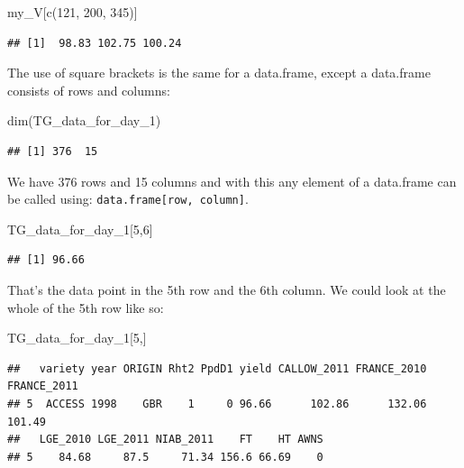 \documentclass[
]{book}
\newenvironment{Shaded}{\begin{snugshade}}{\end{snugshade}}
\newcommand{\DecValTok}[1]{\textcolor[rgb]{0.00,0.00,0.81}{#1}}
\newcommand{\FunctionTok}[1]{\textcolor[rgb]{0.00,0.00,0.00}{#1}}
\newcommand{\NormalTok}[1]{#1}
\begin{document}
\begin{Shaded}
\begin{Highlighting}[]
\NormalTok{my\_V[}\FunctionTok{c}\NormalTok{(}\DecValTok{121}\NormalTok{, }\DecValTok{200}\NormalTok{, }\DecValTok{345}\NormalTok{)]}
\end{Highlighting}
\end{Shaded}

\begin{verbatim}
## [1]  98.83 102.75 100.24
\end{verbatim}

The use of square brackets is the same for a data.frame, except a data.frame consists of rows and columns:

\begin{Shaded}
\begin{Highlighting}[]
\FunctionTok{dim}\NormalTok{(TG\_data\_for\_day\_1)}
\end{Highlighting}
\end{Shaded}

\begin{verbatim}
## [1] 376  15
\end{verbatim}

We have 376 rows and 15 columns and with this any element of a data.frame can be called using: \texttt{data.frame{[}row,\ column{]}}.

\begin{Shaded}
\begin{Highlighting}[]
\NormalTok{TG\_data\_for\_day\_1[}\DecValTok{5}\NormalTok{,}\DecValTok{6}\NormalTok{]}
\end{Highlighting}
\end{Shaded}

\begin{verbatim}
## [1] 96.66
\end{verbatim}

That's the data point in the 5th row and the 6th column. We could look at the whole of the 5th row like so:

\begin{Shaded}
\begin{Highlighting}[]
\NormalTok{TG\_data\_for\_day\_1[}\DecValTok{5}\NormalTok{,]}
\end{Highlighting}
\end{Shaded}

\begin{verbatim}
##   variety year ORIGIN Rht2 PpdD1 yield CALLOW_2011 FRANCE_2010 FRANCE_2011
## 5  ACCESS 1998    GBR    1     0 96.66      102.86      132.06      101.49
##   LGE_2010 LGE_2011 NIAB_2011    FT    HT AWNS
## 5    84.68     87.5     71.34 156.6 66.69    0
\end{verbatim}
\end{document}
